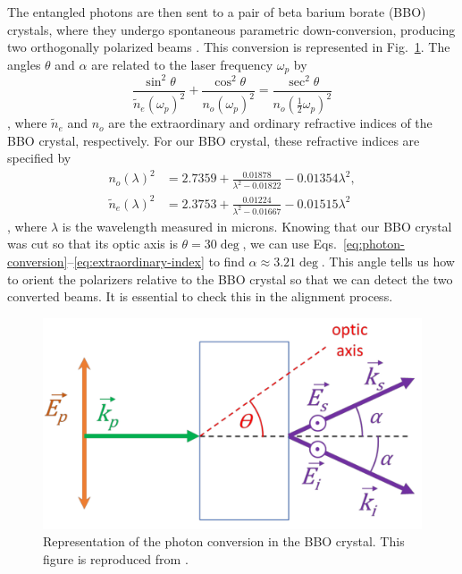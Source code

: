 \documentclass{../paper}
\newcommand{\eqs}[2]{Eqs.~\eqref{#1}--\eqref{#2}}
\newcommand{\fig}[1]{Fig.~\ref{#1}}
\begin{document}
The entangled photons are then sent to a pair of beta barium borate (BBO) crystals, where they undergo spontaneous parametric down-conversion, producing two orthogonally polarized beams \cite{Dehlinger2002}. This conversion is represented in \fig{fig:photon-conversion}. The angles $\theta$ and $\alpha$ are related to the laser frequency $\omega_p$ by
\begin{equation}\label{eq:photon-conversion}
  \frac{\sin^2\theta}{\tilde n_e(\omega_p)^2} + \frac{\cos^2\theta}{n_o(\omega_p)^2} = \frac{\sec^2\theta}{n_o(\frac12\omega_p)^2}
\end{equation}
\cite{LabManual}, where $\tilde n_e$ and $n_o$ are the extraordinary and ordinary refractive indices of the BBO crystal, respectively. For our BBO crystal, these refractive indices are specified by
\begin{align}
  n_o(\lambda)^2 &= 2.7359 + \frac{0.01878}{\lambda^2 - 0.01822} - 0.01354 \lambda^2, \label{eq:ordinary-index} \\
  \tilde n_e(\lambda)^2 &= 2.3753 + \frac{0.01224}{\lambda^2 - 0.01667} - 0.01515 \lambda^2 \label{eq:extraordinary-index}
\end{align}
\cite{LabManual}, where $\lambda$ is the wavelength measured in microns. Knowing that our BBO crystal was cut so that its optic axis is $\theta = 30\deg$, we can use \eqs{eq:photon-conversion}{eq:extraordinary-index} to find $\alpha \approx 3.21\deg$. This angle tells us how to orient the polarizers relative to the BBO crystal so that we can detect the two converted beams. It is essential to check this in the alignment process.

\begin{figure}
  \centering
  \includegraphics[width=0.9\columnwidth]{assets/photon-conversion.png}
  \caption{Representation of the photon conversion in the BBO crystal. This figure is reproduced from \cite{LabManual}.}
  \label{fig:photon-conversion}
\end{figure}
\end{document}
